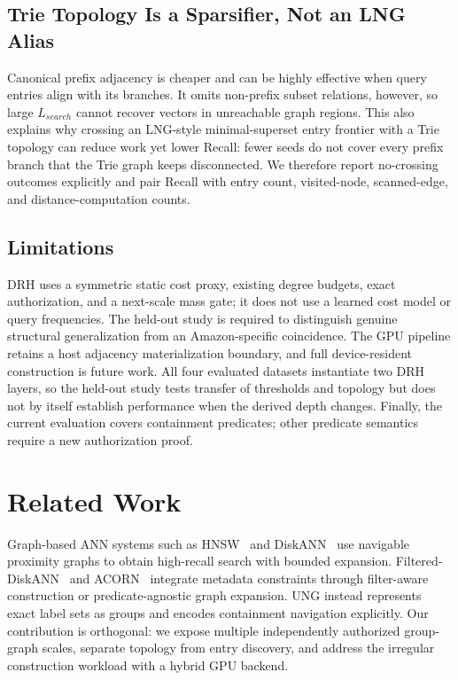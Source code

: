 \documentclass[sigconf,review,anonymous]{acmart}
\begin{document}
\subsection{Trie Topology Is a Sparsifier, Not an LNG Alias}
Canonical prefix adjacency is cheaper and can be highly effective when query
entries align with its branches.  It omits non-prefix subset relations,
however, so large $L_{search}$ cannot recover vectors in unreachable graph
regions.  This also explains why crossing an LNG-style minimal-superset entry
frontier with a Trie topology can reduce work yet lower Recall: fewer seeds do
not cover every prefix branch that the Trie graph keeps disconnected.  We
therefore report no-crossing outcomes explicitly and pair Recall with entry
count, visited-node, scanned-edge, and distance-computation counts.

\subsection{Limitations}
DRH uses a symmetric static cost proxy, existing degree budgets, exact
authorization, and a next-scale mass gate; it does not use a learned cost model
or query frequencies. The
held-out study is required to distinguish genuine structural generalization
from an Amazon-specific coincidence.  The GPU pipeline retains a host
adjacency materialization boundary, and full device-resident construction is
future work.  All four evaluated datasets instantiate two DRH layers, so the
held-out study tests transfer of thresholds and topology but does not by itself
establish performance when the derived depth changes.  Finally, the current
evaluation covers containment predicates;
other predicate semantics require a new authorization proof.

\section{Related Work}
Graph-based ANN systems such as HNSW~\cite{malkov2020hnsw} and
DiskANN~\cite{subramanya2019diskann} use navigable proximity graphs to obtain
high-recall search with bounded expansion.  Filtered-DiskANN~\cite{gollapudi2023filtereddiskann}
and ACORN~\cite{patel2024acorn} integrate metadata constraints through
filter-aware construction or predicate-agnostic graph expansion.  UNG instead represents exact label sets as
groups and encodes containment navigation explicitly.  Our contribution is
orthogonal: we expose multiple independently authorized group-graph scales,
separate topology from entry discovery, and address the irregular construction
workload with a hybrid GPU backend.
\end{document}
